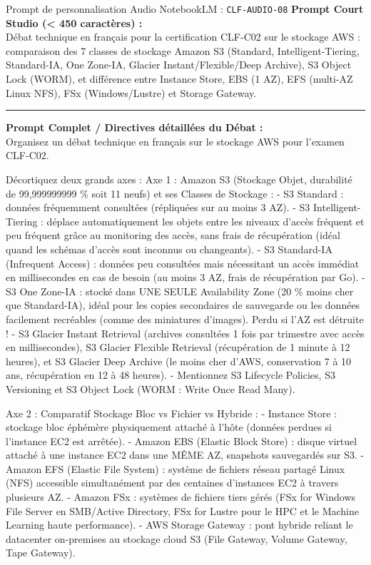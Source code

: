 \documentclass[11pt,a4paper]{article}
\begin{document}
\begin{promptbox}{Prompt de personnalisation Audio NotebookLM : \texttt{CLF-AUDIO-08}}
\textbf{Prompt Court Studio (< 450 caractères) :}\\
Débat technique en français pour la certification CLF-C02 sur le stockage AWS : comparaison des 7 classes de stockage Amazon S3 (Standard, Intelligent-Tiering, Standard-IA, One Zone-IA, Glacier Instant/Flexible/Deep Archive), S3 Object Lock (WORM), et différence entre Instance Store, EBS (1 AZ), EFS (multi-AZ Linux NFS), FSx (Windows/Lustre) et Storage Gateway.

\medskip\hrule\medskip
\textbf{Prompt Complet / Directives détaillées du Débat :}\\
Organisez un débat technique en français sur le stockage AWS pour l'examen CLF-C02.

Décortiquez deux grands axes :
Axe 1 : Amazon S3 (Stockage Objet, durabilité de 99,999999999 \% soit 11 neufs) et ses Classes de Stockage :
- S3 Standard : données fréquemment consultées (répliquées sur au moins 3 AZ).
- S3 Intelligent-Tiering : déplace automatiquement les objets entre les niveaux d'accès fréquent et peu fréquent grâce au monitoring des accès, sans frais de récupération (idéal quand les schémas d'accès sont inconnus ou changeants).
- S3 Standard-IA (Infrequent Access) : données peu consultées mais nécessitant un accès immédiat en millisecondes en cas de besoin (au moins 3 AZ, frais de récupération par Go).
- S3 One Zone-IA : stocké dans UNE SEULE Availability Zone (20 \% moins cher que Standard-IA), idéal pour les copies secondaires de sauvegarde ou les données facilement recréables (comme des miniatures d'images). Perdu si l'AZ est détruite !
- S3 Glacier Instant Retrieval (archives consultées 1 fois par trimestre avec accès en millisecondes), S3 Glacier Flexible Retrieval (récupération de 1 minute à 12 heures), et S3 Glacier Deep Archive (le moins cher d'AWS, conservation 7 à 10 ans, récupération en 12 à 48 heures).
- Mentionnez S3 Lifecycle Policies, S3 Versioning et S3 Object Lock (WORM : Write Once Read Many).

Axe 2 : Comparatif Stockage Bloc vs Fichier vs Hybride :
- Instance Store : stockage bloc éphémère physiquement attaché à l'hôte (données perdues si l'instance EC2 est arrêtée).
- Amazon EBS (Elastic Block Store) : disque virtuel attaché à une instance EC2 dans une MÊME AZ, snapshots sauvegardés sur S3.
- Amazon EFS (Elastic File System) : système de fichiers réseau partagé Linux (NFS) accessible simultanément par des centaines d'instances EC2 à travers plusieurs AZ.
- Amazon FSx : systèmes de fichiers tiers gérés (FSx for Windows File Server en SMB/Active Directory, FSx for Lustre pour le HPC et le Machine Learning haute performance).
- AWS Storage Gateway : pont hybride reliant le datacenter on-premises au stockage cloud S3 (File Gateway, Volume Gateway, Tape Gateway).
\end{promptbox}
\end{document}
